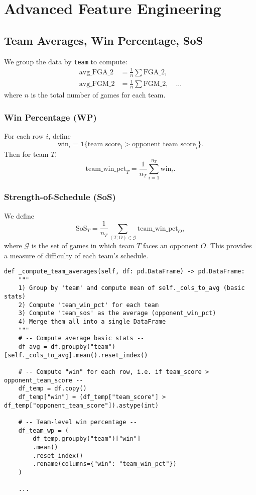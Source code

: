 \documentclass[12pt]{article}
\begin{document}
\section{Advanced Feature Engineering}

\subsection{Team Averages, Win Percentage, SoS}
We group the data by \texttt{team} to compute:
\begin{align*}
\text{avg\_FGA\_2} &= \frac{1}{n}\sum \text{FGA\_2}, \\
\text{avg\_FGM\_2} &= \frac{1}{n}\sum \text{FGM\_2}, \quad \ldots
\end{align*}
where \(n\) is the total number of games for each team.

\subsubsection{Win Percentage (WP)}
For each row \(i\), define
\[
\text{win}_i = \mathbf{1}\{ \text{team\_score}_i > \text{opponent\_team\_score}_i \}.
\]
Then for team \(T\),
\[
\text{team\_win\_pct}_T = \frac{1}{n_T} \sum_{i=1}^{n_T} \text{win}_i.
\]

\subsubsection{Strength-of-Schedule (SoS)}
We define
\[
\text{SoS}_T = \frac{1}{n_T} \sum_{(T, O) \in \mathcal{G}} \text{team\_win\_pct}_O,
\]
where \(\mathcal{G}\) is the set of games in which team \(T\) faces an opponent \(O\). This provides a measure of difficulty of each team’s schedule.

\begin{verbatim}
def _compute_team_averages(self, df: pd.DataFrame) -> pd.DataFrame:
    """
    1) Group by 'team' and compute mean of self._cols_to_avg (basic stats)
    2) Compute 'team_win_pct' for each team
    3) Compute 'team_sos' as the average (opponent_win_pct)
    4) Merge them all into a single DataFrame
    """
    # -- Compute average basic stats --
    df_avg = df.groupby("team")[self._cols_to_avg].mean().reset_index()

    # -- Compute "win" for each row, i.e. if team_score > opponent_team_score --
    df_temp = df.copy()
    df_temp["win"] = (df_temp["team_score"] > df_temp["opponent_team_score"]).astype(int)

    # -- Team-level win percentage --
    df_team_wp = (
        df_temp.groupby("team")["win"]
        .mean()
        .reset_index()
        .rename(columns={"win": "team_win_pct"})
    )

    ...
\end{verbatim}
\end{document}
